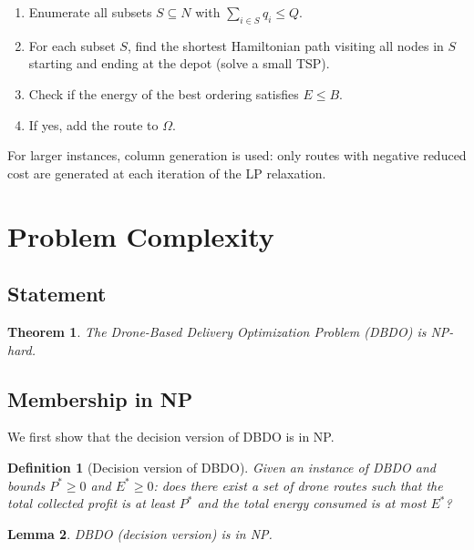 \documentclass[12pt,a4paper]{article}
\newtheorem{theorem}{Theorem}
\newtheorem{lemma}[theorem]{Lemma}
\newtheorem{definition}{Definition}
\begin{document}
\begin{enumerate}
  \item Enumerate all subsets $S \subseteq N$ with $\sum_{i \in S} q_i \leq Q$.
  \item For each subset $S$, find the shortest Hamiltonian path visiting all nodes in $S$
  starting and ending at the depot (solve a small TSP).
  \item Check if the energy of the best ordering satisfies $E \leq B$.
  \item If yes, add the route to $\Omega$.
\end{enumerate}

For larger instances, column generation is used: only routes with negative reduced cost
are generated at each iteration of the LP relaxation.

\section{Problem Complexity}
\label{sec:complexity}

\subsection{Statement}

\begin{theorem}
The Drone-Based Delivery Optimization Problem (DBDO) is NP-hard.
\end{theorem}

\subsection{Membership in NP}

We first show that the decision version of DBDO is in NP.

\begin{definition}[Decision version of DBDO]
Given an instance of DBDO and bounds $P^* \geq 0$ and $E^* \geq 0$: does there exist
a set of drone routes such that the total collected profit is at least $P^*$ and the
total energy consumed is at most $E^*$?
\end{definition}

\begin{lemma}
DBDO (decision version) is in NP.
\end{lemma}
\end{document}
